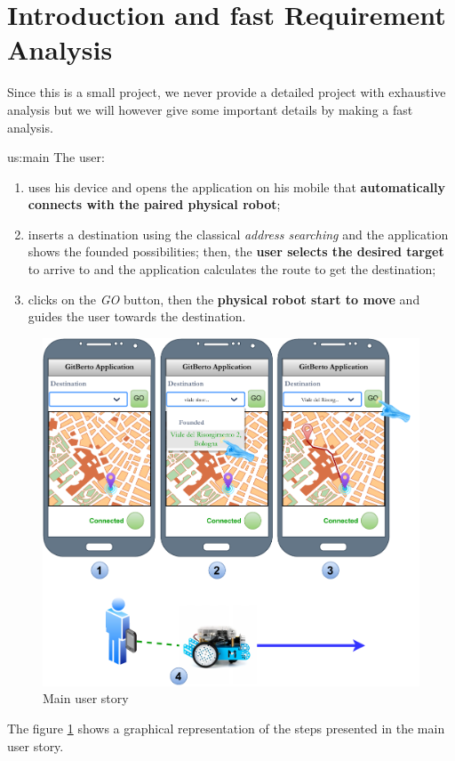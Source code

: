 \section{Introduction and fast Requirement Analysis}

Since this is a small project, we never provide a detailed project with exhaustive analysis but we will however give some important details by making a fast analysis.

\hspace{10pt}
\begin{userstory}{us:main}
	The user:
	\begin{enumerate}
		\item uses his device and opens the \gitberto application on his mobile that \textbf{automatically connects with the paired physical robot}; 
		\item inserts a destination using the classical \textit{address searching} and the application shows the founded possibilities; then, the \textbf{user selects the desired target} to arrive to and the application calculates the route to get the destination;
		\item clicks on the \textit{GO} button, then the \textbf{physical \gitberto robot start to move} and guides the user towards the destination.
	\end{enumerate}
	
\end{userstory}
\begin{figure}[h]
	\centering
	\includegraphics[width=\textwidth]{img/user_story_main.pdf}
	\caption{Main user story}
	\label{fig:user_story_main}
\end{figure}

The figure \ref{fig:user_story_main} shows a graphical representation of the steps presented in the main user story. 


